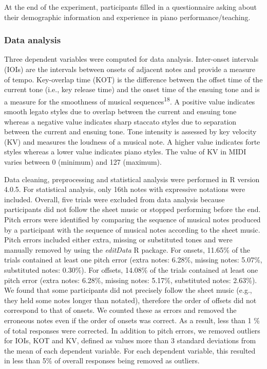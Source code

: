 \documentclass[
  man,floatsintext]{apa6}
\begin{document}
At the end of the experiment, participants filled in a questionnaire asking about their demographic information and experience in piano performance/teaching.

\hypertarget{data-analysis}{%
\subsubsection{Data analysis}\label{data-analysis}}

Three dependent variables were computed for data analysis. Inter-onset intervals (IOIs) are the intervals between onsets of adjacent notes and provide a measure of tempo. Key-overlap time (KOT) is the difference between the offset time of the current tone (i.e., key release time) and the onset time of the ensuing tone and is a measure for the smoothness of musical sequences\textsuperscript{18}. A positive value indicates smooth legato styles due to overlap between the current and ensuing tone whereas a negative value indicates sharp staccato styles due to separation between the current and ensuing tone. Tone intensity is assessed by key velocity (KV) and measures the loudness of a musical note. A higher value indicates forte styles whereas a lower value indicates piano styles. The value of KV in MIDI varies between 0 (minimum) and 127 (maximum).

Data cleaning, preprocessing and statistical analysis were performed in R version 4.0.5. For statistical analysis, only 16th notes with expressive notations were included. Overall, five trials were excluded from data analysis because participants did not follow the sheet music or stopped performing before the end. Pitch errors were identified by comparing the sequence of musical notes produced by a participant with the sequence of musical notes according to the sheet music. Pitch errors included either extra, missing or substituted tones and were manually removed by using the \emph{editData} R package. For onsets, 11.65\% of the trials contained at least one pitch error (extra notes: 6.28\%, missing notes: 5.07\%, substituted notes: 0.30\%). For offsets, 14.08\% of the trials contained at least one pitch error (extra notes: 6.28\%, missing notes: 5.17\%, substituted notes: 2.63\%). We found that some participants did not precisely follow the sheet music (e.g., they held some notes longer than notated), therefore the order of offsets did not correspond to that of onsets. We counted these as errors and removed the erroneous notes even if the order of onsets was correct. As a result, less than 1 \% of total responses were corrected. In addition to pitch errors, we removed outliers for IOIs, KOT and KV, defined as values more than 3 standard deviations from the mean of each dependent variable. For each dependent variable, this resulted in less than 5\% of overall responses being removed as outliers.
\end{document}
